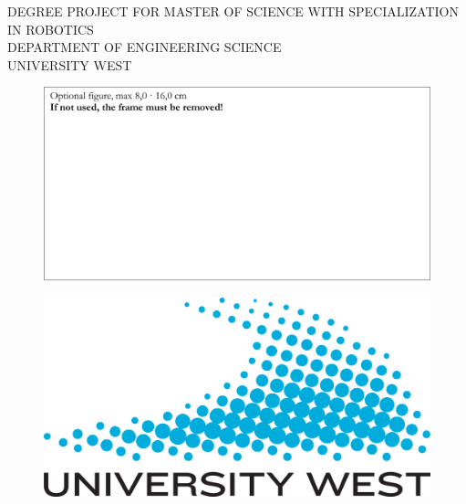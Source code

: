 
\fancyhead{} %
\thispagestyle{empty}

\begin{titlepage}

    \begin{center}
        \scriptsize{DEGREE PROJECT FOR MASTER OF SCIENCE WITH SPECIALIZATION IN ROBOTICS\\
            \vspace{2mm}DEPARTMENT OF ENGINEERING SCIENCE\\
            \vspace{2mm}UNIVERSITY WEST}
    \end{center} 
    
    \vspace*{2.0cm}
    \RaggedRight
    \huge\textbf{\myTitle}     
    \RaggedRight
    \vspace{0.1cm}
    \large\textbf{\mySubTitle}          
    \vspace{3.0cm}
               
    \RaggedRight\Large\textbf{\myName}
        
    \vspace{1.2cm}
        \begin{figure}[hbt!]
            \centering
            \includegraphics[width=\linewidth]{figures/Logos/TextBox.png}
        \end{figure}
                    
    \begin{figure}[b]
    \centering
    \includegraphics[width=0.4\linewidth]{figures/Logos/3.-engelsk-logotyp-jpg.jpg}
    \end{figure}
            
\end{titlepage}